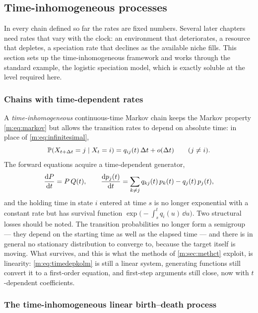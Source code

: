 \subsection{Time-inhomogeneous processes}
\label{m:sec:inhomog}

In every chain defined so far the rates are fixed numbers. Several later
chapters need rates that vary with the clock: an environment that deteriorates,
a resource that depletes, a speciation rate that declines as the available
niche fills. This section sets up the time-inhomogeneous framework and works
through the standard example, the logistic speciation model, which is exactly
soluble at the level required here.

\subsubsection{Chains with time-dependent rates}
\label{m:sec:timedep}

A \emph{time-inhomogeneous} continuous-time Markov chain keeps the Markov
property \cref{m:eq:markov} but allows the transition rates to depend on
absolute time: in place of \cref{m:eq:infinitesimal},
\begin{equation}
\label{m:eq:infinitesimalt}
\mathbb{P}\!\left(X_{t+\Delta t} = j \mid X_t = i\right) = q_{ij}(t)\,\Delta t + o(\Delta t)
\qquad (j\neq i) .
\end{equation}
The forward equations acquire a time-dependent generator,
\begin{equation}
\label{m:eq:timedepkolm}
\frac{\mathrm{d} P}{\mathrm{d} t} = P\,Q(t),
\qquad
\frac{\mathrm{d} p_j(t)}{\mathrm{d} t} = \sum_{k\neq j}q_{kj}(t)\,p_k(t) - q_j(t)\,p_j(t) ,
\end{equation}
and the holding time in state $i$ entered at time $s$ is no longer exponential
with a constant rate but has survival function
$\exp\bigl(-\int_s^t q_i(u)\,\dd u\bigr)$. Two structural losses should be
noted. The transition probabilities no longer form a semigroup --- they depend
on the starting time as well as the elapsed time --- and there is in general no
stationary distribution to converge to, because the target itself is moving.
What survives, and this is what the methods of \cref{m:sec:methct} exploit, is
linearity: \cref{m:eq:timedepkolm} is still a linear system, generating
functions still convert it to a first-order equation, and first-step arguments
still close, now with $t$-dependent coefficients.

\subsubsection{The time-inhomogeneous linear birth--death process}
\label{m:sec:tibd}

